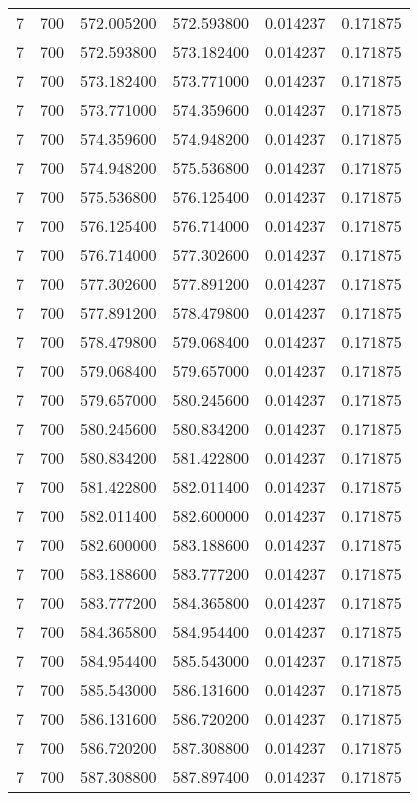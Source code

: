 \begin{longtable}{rrrrrr}
7 & 700 & 572.005200 & 572.593800 & 0.014237 & 0.171875 \\
7 & 700 & 572.593800 & 573.182400 & 0.014237 & 0.171875 \\
7 & 700 & 573.182400 & 573.771000 & 0.014237 & 0.171875 \\
7 & 700 & 573.771000 & 574.359600 & 0.014237 & 0.171875 \\
7 & 700 & 574.359600 & 574.948200 & 0.014237 & 0.171875 \\
7 & 700 & 574.948200 & 575.536800 & 0.014237 & 0.171875 \\
7 & 700 & 575.536800 & 576.125400 & 0.014237 & 0.171875 \\
7 & 700 & 576.125400 & 576.714000 & 0.014237 & 0.171875 \\
7 & 700 & 576.714000 & 577.302600 & 0.014237 & 0.171875 \\
7 & 700 & 577.302600 & 577.891200 & 0.014237 & 0.171875 \\
7 & 700 & 577.891200 & 578.479800 & 0.014237 & 0.171875 \\
7 & 700 & 578.479800 & 579.068400 & 0.014237 & 0.171875 \\
7 & 700 & 579.068400 & 579.657000 & 0.014237 & 0.171875 \\
7 & 700 & 579.657000 & 580.245600 & 0.014237 & 0.171875 \\
7 & 700 & 580.245600 & 580.834200 & 0.014237 & 0.171875 \\
7 & 700 & 580.834200 & 581.422800 & 0.014237 & 0.171875 \\
7 & 700 & 581.422800 & 582.011400 & 0.014237 & 0.171875 \\
7 & 700 & 582.011400 & 582.600000 & 0.014237 & 0.171875 \\
7 & 700 & 582.600000 & 583.188600 & 0.014237 & 0.171875 \\
7 & 700 & 583.188600 & 583.777200 & 0.014237 & 0.171875 \\
7 & 700 & 583.777200 & 584.365800 & 0.014237 & 0.171875 \\
7 & 700 & 584.365800 & 584.954400 & 0.014237 & 0.171875 \\
7 & 700 & 584.954400 & 585.543000 & 0.014237 & 0.171875 \\
7 & 700 & 585.543000 & 586.131600 & 0.014237 & 0.171875 \\
7 & 700 & 586.131600 & 586.720200 & 0.014237 & 0.171875 \\
7 & 700 & 586.720200 & 587.308800 & 0.014237 & 0.171875 \\
7 & 700 & 587.308800 & 587.897400 & 0.014237 & 0.171875 \\

\end{longtable}

